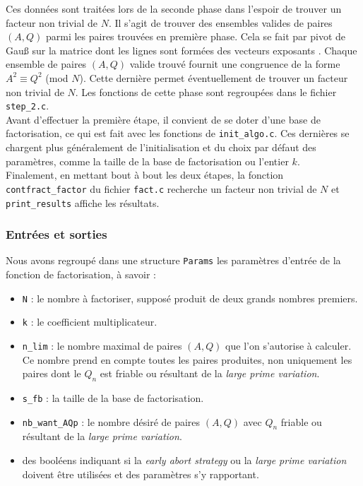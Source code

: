 Ces données sont traitées lors de la seconde phase dans l'espoir de trouver un
facteur non trivial de $N$. Il s'agit de trouver des ensembles valides de
paires $(A, Q)$ parmi les paires trouvées en première phase. Cela se fait par
pivot de Gau\ss{} sur la matrice dont les lignes sont formées des vecteurs
exposants . Chaque ensemble de paires $(A, Q)$ valide trouvé
fournit une congruence de la forme $A^2 \equiv Q^2$ (mod $N$). Cette dernière
permet éventuellement de trouver un facteur non trivial de $N$. Les fonctions de 
cette phase sont regroupées dans le fichier \texttt{step\_2.c}. \\

Avant d'effectuer la première étape, il convient de se doter d'une base de
factorisation, ce qui est fait avec les fonctions de \texttt{init\_algo.c}.
Ces dernières se chargent plus généralement de l'initialisation et du choix par
défaut des paramètres, comme la taille de la base de factorisation ou l'entier
$k$. \\

Finalement, en mettant bout à bout les deux étapes, la fonction 
\texttt{contfract\_factor} du fichier \texttt{fact.c} recherche un facteur
non trivial de $N$ et \texttt{print\_results} affiche les résultats. 

\subsubsection{Entrées et sorties}

Nous avons regroupé dans une structure \texttt{Params} les paramètres d'entrée
de la fonction de factorisation, à savoir :

\begin{itemize}
	\item \texttt{N} : le nombre à factoriser, supposé produit de deux grands
	nombres premiers.
    \item \texttt{k} : le coefficient multiplicateur.
	\item \texttt{n\_lim} : le nombre maximal de paires $(A,Q)$ que l'on
	s'autorise à calculer. Ce nombre prend en compte toutes les paires
	produites, non uniquement les paires dont le $Q_n$ est friable ou résultant
	de la \textit{large prime variation}.
    \item \texttt{s\_fb} : la taille de la base de factorisation. 
	\item \texttt{nb\_want\_AQp} : le nombre désiré de paires $(A,Q)$ avec
	$Q_n$ friable ou résultant de la \textit{large prime variation}.
	\item des booléens indiquant si la \textit{early abort strategy} ou la
	\textit{large prime variation} doivent être utilisées et des paramètres s'y
	rapportant.
\end{itemize}

